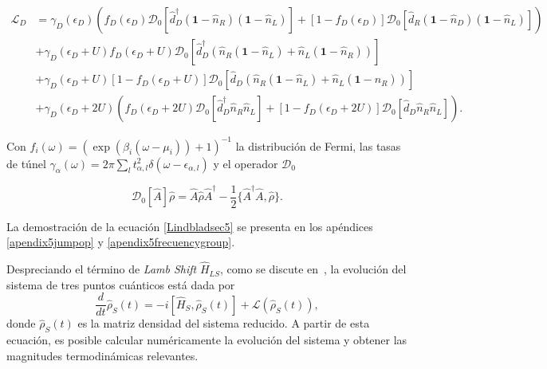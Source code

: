 \begin{align*}
    \mathcal{L}_{D} & = \gamma_{D}(\epsilon_{D})(f_{D}(\epsilon_{D})\mathcal{D}_{0}[\hat{d}^{\dagger}_{D}(\textbf{1}-\hat{n}_{R})(\textbf{1}-\hat{n}_{L}) ]  + [1-f_{D}(\epsilon_{D})]\mathcal{D}_{0}[\hat{d}_{R}(\textbf{1}-\hat{n}_{D})(\textbf{1}-\hat{n}_{L}) ]  )  \\
                    & + \gamma_{D}(\epsilon_{D}+U)f_{D}(\epsilon_{D}+U)\mathcal{D}_{0}[\hat{d}^{\dagger}_{D}(\hat{n}_{R}(\textbf{1}-\hat{n}_{L}) + \hat{n}_{L}(\textbf{1}-\hat{n}_{R})) ]  \\
                    & + \gamma_{D}(\epsilon_{D}+U)[1-f_{D}(\epsilon_{D}+U)]\mathcal{D}_{0}[\hat{d}_{D}(\hat{n}_{R}(\textbf{1}-\hat{n}_{L}) + \hat{n}_{L}(\textbf{1}-\hat{n}_{R}))]   \\
                   & + \gamma_{D}(\epsilon_{D}+2U)(f_{D}(\epsilon_{D}+2U)\mathcal{D}_{0}[\hat{d}^{\dagger}_{D}\hat{n}_{R}\hat{n}_{L} ]  + [1-f_{D}(\epsilon_{D}+2U)]\mathcal{D}_{0}[\hat{d}_{D}\hat{n}_{R}\hat{n}_{L} ]  ).
\end{align*}

Con $f_{i}(\omega) = (\exp(\beta_{i}(\omega - \mu_{i})) + 1)^{-1}$ la distribución de Fermi, las tasas de túnel $\gamma_{\alpha}(\omega)= 2\pi \sum_{l}t^{2}_{\alpha,l}\delta(\omega-\epsilon_{\alpha,l})$ y el operador $\mathcal{D}_{0}$  

\begin{equation*}
    \mathcal{D}_{0}[\hat{A}]\hat{\rho} = \hat{A}\hat{\rho}\hat{A}^{\dagger}- \frac{1}{2} \{\hat{A }^{\dagger}\hat{A},\hat{\rho} \}.
\end{equation*}

La demostración de la ecuación \ref{Lindbladsec5} se presenta en los apéndices \ref{apendix5jumpop} y \ref{apendix5frecuencygroup}.

Despreciando el término de \textit{Lamb Shift} $\hat{H}_{LS}$, como se discute en~\cite{prech2023entanglement}, la evolución del sistema de tres puntos cuánticos está dada por
\begin{equation}
    \frac{d}{dt}\hat{\rho}_{S}(t) = -i[\hat{H}_{S},\hat{\rho}_{S}(t)] + \mathcal{L}(\hat{\rho}_{S}(t)),
\end{equation}
donde $\hat{\rho}_{S}(t)$ es la matriz densidad del sistema reducido. A partir de esta ecuación, es posible calcular numéricamente la evolución del sistema y obtener las magnitudes termodinámicas relevantes.

